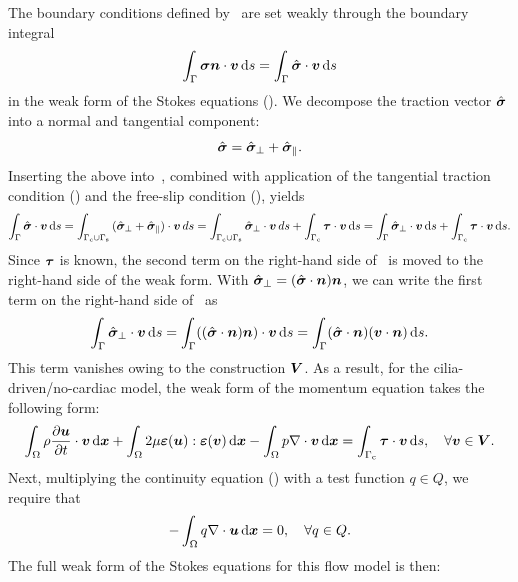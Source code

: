 \documentclass{WileyMSP-template}
\begin{document}
The boundary conditions defined by~
are set weakly through the boundary integral 
\begin{equation}
    \int_{\Gamma}\bm{\sigma}\bm{n}\cdot\bm{v} \, \mathrm ds =  \int_{\Gamma}\hat{\bm{\sigma}}\cdot\bm{v} \, \mathrm ds
    \label{eq:boundary_integral_BC1}
\end{equation}
in the weak form of the Stokes equations ().
We decompose the traction vector $\hat{\bm{\sigma}}$ into a normal and tangential component:
\begin{equation*}
    \hat{\bm{\sigma}} = \hat{\bm{\sigma}}_{\perp} + \hat{\bm{\sigma}}_{\parallel}.
\end{equation*}
Inserting the above into~,
combined with application of the tangential traction
condition () and the
free-slip condition (), yields
\begin{equation}
    \int_{\Gamma}\hat{\bm{\sigma}}\cdot\bm{v} \, \mathrm ds = \int_{\Gamma_{\mathrm{c}}\cup\Gamma_{\mathrm{s}}}{(\hat{\bm{\sigma}}_{\perp} + \hat{\bm{\sigma}}_{\parallel})\cdot\bm{v}}\, ds = 
    \int_{\Gamma_{\mathrm{c}}\cup\Gamma_{\mathrm{s}}}{\hat{\bm{\sigma}}_{\perp}\cdot\bm{v}}\, ds
    + \int_{\Gamma_{\mathrm{c}}}\bm{\tau}\cdot\bm{v} \, \mathrm ds = \int_{\Gamma}\hat{\bm{\sigma}}_{\perp}\cdot\bm{v} \, \mathrm ds + \int_{\Gamma_{\mathrm{c}}}\bm{\tau}\cdot\bm{v} \, \mathrm ds.
    \label{eq:boundary_integral_BC2}
\end{equation}
Since $\bm{\tau}$ is known, the second term on the right-hand side of~
is moved to the right-hand side of the weak form.
With $\hat{\bm{\sigma}}_{\perp} = (\hat{\bm{\sigma}}\cdot\bm{n})\bm{n}$,
we can write the first term on the right-hand side of~ as
\begin{equation}
    \int_{\Gamma}\hat{\bm{\sigma}}_{\perp}\cdot\bm{v} \, \mathrm ds = \int_{\Gamma}((\hat{\bm{\sigma}}\cdot\bm{n})\bm{n})\cdot\bm{v} \, \mathrm ds =
    \int_{\Gamma}(\hat{\bm{\sigma}}\cdot\bm{n})(\bm{v}\cdot\bm{n}) \, \mathrm ds.
    \label{eq:boundary_integral_BC_normal}
\end{equation}
This term vanishes owing to the construction $\bm{V}$.
As a result, for the cilia-driven/no-cardiac model,
the weak form of the momentum equation takes the following form:
\begin{equation*}
    \int_{\Omega}\rho\frac{\partial \bm{u}}{\partial t}\cdot\bm{v} \, \mathrm d\bm{x}
    + \int_{\Omega}2\mu\bm{\varepsilon}(\bm{u}) : \bm{\varepsilon}(\bm{v}) \, \mathrm d\bm{x}
    - \int_{\Omega}p\nabla\cdot\bm{v} \, \mathrm d\bm{x} = \int_{\Gamma_{\mathrm{c}}}\bm{\tau}\cdot\bm{v} \, \mathrm ds, \quad\forall\bm{v}\in\bm{V}.
\end{equation*}
Next, multiplying the continuity equation ()
with a test function $q\in Q$, we require that
\begin{equation}
    -\int_{\Omega}q\nabla\cdot\bm{u} \, \mathrm d\bm{x} = 0,\quad\forall q\in Q.
    \label{eq:pressure_weak_form}
\end{equation}
The full weak form of the Stokes equations for this flow model is then:
\end{document}
